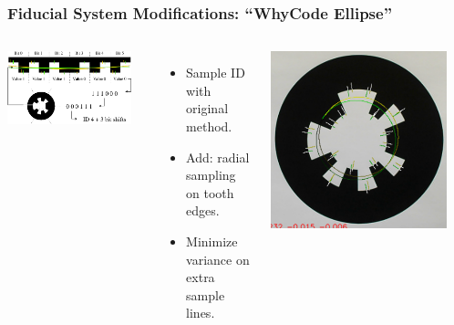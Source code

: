 \documentclass[aspectratio=169]{rubeamer}
\newif\ifpause
\newcommand{\mypause}{\ifpause \pause \fi}
\begin{document}
\fi

\begin{frame}
  \frametitle{Fiducial System Modifications: ``WhyCode Ellipse''}

  \begin{columns}
    \includegraphics[width=0.9\textwidth]{whycode_layout_with_sample_lines_ellipse}
    \begin{itemize}
      \mypause
      \item Sample ID with original method.
      \mypause
      \item Add: radial sampling on tooth edges.
      \mypause
      \item Minimize variance on extra sample lines.
    \end{itemize}
    \centering
    \onslide
    \includegraphics[width=0.9\textwidth]{whycode_ellipse_both_solutions_cropped}\\
  \end{columns}
\end{frame}
\end{document}
